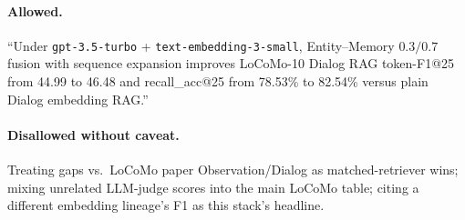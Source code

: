 \documentclass[11pt]{article}
\begin{document}
\paragraph{Allowed.}
``Under \texttt{gpt-3.5-turbo} + \texttt{text-embedding-3-small}, Entity--Memory $0.3/0.7$ fusion with sequence expansion improves LoCoMo-10 Dialog RAG token-F1@25 from 44.99 to 46.48 and recall\_acc@25 from 78.53\% to 82.54\% versus plain Dialog embedding RAG.''

\paragraph{Disallowed without caveat.}
Treating gaps vs.\ LoCoMo paper Observation/Dialog as matched-retriever wins; mixing unrelated LLM-judge scores into the main LoCoMo table; citing a different embedding lineage's F1 as this stack's headline.
\end{document}
